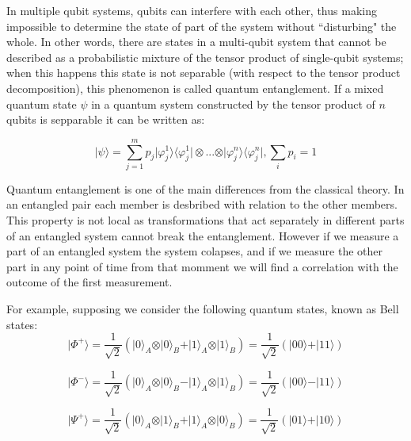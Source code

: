 In multiple qubit systems, qubits can interfere with each other, thus making impossible to determine the state of part of the system without ``disturbing" the whole. In other words, there are states in a multi-qubit system that cannot be described as a probabilistic mixture of the tensor product of single-qubit systems; when this happens this state is not separable (with respect to the tensor product decomposition), this phenomenon is called quantum entanglement\cite{Rieffel2011}. If a mixed quantum state $\psi$ in a quantum system constructed by the tensor product of $n$ qubits is sepparable it can be written as:

\begin{equation}
\vert\psi\rangle= \sum^m_{j=1}{p_{j}\vert\varphi_{j}^{1}\rangle\langle\varphi_{j}^{1}\vert \otimes ... \otimes \vert\varphi_{j}^{n}\rangle\langle\varphi_{j}^{n}\vert}, \sum_{i}{p_{i}}=1
\end{equation}

Quantum entanglement is one of the main differences from the classical theory\cite{Rieffel2011}. In an entangled pair each member is desbribed with relation to the other members. This property is not local as transformations that act separately in different parts of an entangled system cannot break the entanglement. However if we measure a part of an entangled system  the system colapses, and if we measure the other part in any point of time from that momment we will find a correlation with the outcome of the first measurement.

For example, supposing we consider the following quantum states, known as Bell states:
\begin{equation}
\vert\Phi^{+}\rangle=\frac{1}{\sqrt{2}}(\vert0\rangle_{A} \otimes\vert0\rangle_{B} +\vert1\rangle_{A} \otimes\vert1\rangle_{B})=\frac{1}{\sqrt{2}}(\vert00\rangle+\vert11\rangle)
\end{equation}

\begin{equation}
\vert\Phi^{-}\rangle=\frac{1}{\sqrt{2}}(\vert0\rangle_{A} \otimes\vert0\rangle_{B} -\vert1\rangle_{A} \otimes\vert1\rangle_{B})=\frac{1}{\sqrt{2}}(\vert00\rangle-\vert11\rangle)
\end{equation}

\begin{equation}
\vert\Psi^{+}\rangle=\frac{1}{\sqrt{2}}(\vert0\rangle_{A} \otimes\vert1\rangle_{B} +\vert1\rangle_{A}\otimes\vert0\rangle_{B})=\frac{1}{\sqrt{2}}(\vert01\rangle+\vert10\rangle)
\end{equation}

